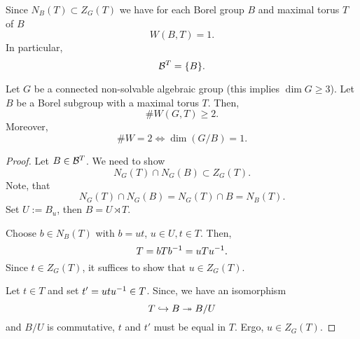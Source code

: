 \begin{corollary}
	Since $N_B(T) \subset Z_G(T)$ we have for each Borel group $B$ and maximal torus $T$ of $B$
	\[ W(B,T) = 1. \]
	In particular,
	\[\mathcal{B}^T = \{B\}. \]
\end{corollary}

\begin{proposition}
	Let $G$ be a connected non-solvable algebraic group (this implies $\dim G \geq 3$). Let $B$ be a Borel subgroup with a maximal torus $T$. Then,
	\[\# W(G,T) \geq 2. \]
	Moreover,
	\[\# W = 2 \iff \dim(G / B) = 1. \]
\end{proposition}

\newpage
\begin{proof}
	Let $B \in \mathcal{B}^T$. We need to show
	\[ N_G(T) \cap N_G(B) \subset Z_G(T). \]
	Note, that
	\[ N_G(T) \cap N_G(B) = N_G(T) \cap B = N_B(T). \]
	Set $U := B_u$, then $B = U \rtimes T$.
	
	Choose $b \in N_B(T)$ with $b = ut$, $u\in U, t \in T$. Then,
	\[ T = bTb^{-1} = uTu^{-1}. \]
	Since $t \in Z_G(T)$, it suffices to show that $u \in Z_G(T)$.
	
	Let $t \in T$ and set $t' = utu^{-1} \in T$. Since, we have an isomorphism
	\[ T \overset{}{\hookrightarrow} B \overset{}{\twoheadrightarrow} B/U \]
	and $B/U$ is commutative, $t$ and $t'$ must be equal in $T$. Ergo, $u \in Z_G(T)$.
\end{proof}
